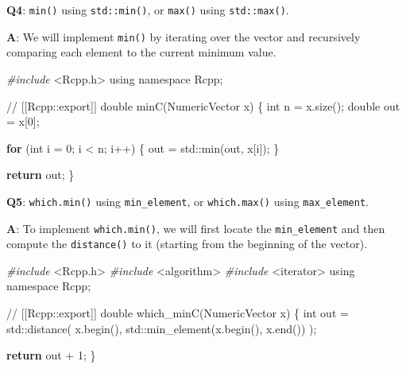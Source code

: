 \documentclass[
]{krantz}
\makeatletter
\newenvironment{Shaded}{\begin{snugshade}}{\end{snugshade}}
\newcommand{\BuiltInTok}[1]{#1}
\newcommand{\CommentTok}[1]{\textcolor[rgb]{0.56,0.35,0.01}{\textit{#1}}}
\newcommand{\ControlFlowTok}[1]{\textcolor[rgb]{0.13,0.29,0.53}{\textbf{#1}}}
\newcommand{\DataTypeTok}[1]{\textcolor[rgb]{0.13,0.29,0.53}{#1}}
\newcommand{\DecValTok}[1]{\textcolor[rgb]{0.00,0.00,0.81}{#1}}
\newcommand{\ImportTok}[1]{#1}
\newcommand{\KeywordTok}[1]{\textcolor[rgb]{0.13,0.29,0.53}{\textbf{#1}}}
\newcommand{\NormalTok}[1]{#1}
\newcommand{\PreprocessorTok}[1]{\textcolor[rgb]{0.56,0.35,0.01}{\textit{#1}}}
\newenvironment{kframe}{%
\medskip{}
\setlength{\fboxsep}{.8em}
 \def\at@end@of@kframe{}%
 \ifinner\ifhmode%
  \def\at@end@of@kframe{\end{minipage}}%
  \begin{minipage}{\columnwidth}%
 \fi\fi%
 \def\FrameCommand##1{\hskip\@totalleftmargin \hskip-\fboxsep
 \colorbox{shadecolor}{##1}\hskip-\fboxsep
     \hskip-\linewidth \hskip-\@totalleftmargin \hskip\columnwidth}%
 \MakeFramed {\advance\hsize-\width
   \@totalleftmargin\z@ \linewidth\hsize
   \@setminipage}}%
 {\par\unskip\endMakeFramed%
 \at@end@of@kframe}
\renewenvironment{Shaded}{\begin{kframe}}{\end{kframe}}
\renewcommand{\KeywordTok} [1]{\textcolor[rgb]{0.00,0.44,0.13}{{#1}}}
\renewcommand{\DataTypeTok}[1]{\textcolor[rgb]{0.56,0.13,0.00}{{#1}}}
\renewcommand{\DecValTok}  [1]{\textcolor[rgb]{0.25,0.63,0.44}{{#1}}}
\renewcommand{\CommentTok} [1]{\textcolor[rgb]{0.38,0.63,0.69}{{#1}}}
\renewcommand{\NormalTok}  [1]{{#1}}
\makeatother
\begin{document}
\textbf{{Q4}}: \texttt{min()} using \texttt{std::min()}, or \texttt{max()} using \texttt{std::max()}.

\textbf{{A}}: We will implement \texttt{min()} by iterating over the vector and recursively comparing each element to the current minimum value.

\begin{Shaded}
\begin{Highlighting}[]
\PreprocessorTok{#include }\ImportTok{<Rcpp.h>}
\KeywordTok{using} \KeywordTok{namespace}\NormalTok{ Rcpp;}

\CommentTok{// [[Rcpp::export]]}
\DataTypeTok{double}\NormalTok{ minC(NumericVector x) \{}
  \DataTypeTok{int}\NormalTok{ n = x.size();}
  \DataTypeTok{double}\NormalTok{ out = x[}\DecValTok{0}\NormalTok{];}
  
  \ControlFlowTok{for}\NormalTok{ (}\DataTypeTok{int}\NormalTok{ i = }\DecValTok{0}\NormalTok{; i < n; i++) \{}
\NormalTok{    out = }\BuiltInTok{std::}\NormalTok{min(out, x[i]);}
\NormalTok{  \}}
  
  \ControlFlowTok{return}\NormalTok{ out;}
\NormalTok{\}}
\end{Highlighting}
\end{Shaded}

\textbf{{Q5}}: \texttt{which.min()} using \texttt{min\_element}, or \texttt{which.max()} using \texttt{max\_element}.

\textbf{{A}}: To implement \texttt{which.min()}, we will first locate the \texttt{min\_element} and then compute the \texttt{distance()} to it (starting from the beginning of the vector).

\begin{Shaded}
\begin{Highlighting}[]
\PreprocessorTok{#include }\ImportTok{<Rcpp.h>}
\PreprocessorTok{#include }\ImportTok{<algorithm>}
\PreprocessorTok{#include }\ImportTok{<iterator>}
\KeywordTok{using} \KeywordTok{namespace}\NormalTok{ Rcpp;}

\CommentTok{// [[Rcpp::export]]}
\DataTypeTok{double}\NormalTok{ which_minC(NumericVector x) \{}
  \DataTypeTok{int}\NormalTok{ out = }\BuiltInTok{std::}\NormalTok{distance(}
\NormalTok{    x.begin(), }\BuiltInTok{std::}\NormalTok{min_element(x.begin(), x.end())}
\NormalTok{  );}

  \ControlFlowTok{return}\NormalTok{ out + }\DecValTok{1}\NormalTok{;}
\NormalTok{\}}
\end{Highlighting}
\end{Shaded}
\end{document}
